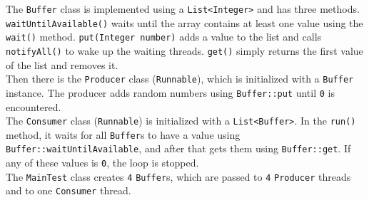 \documentclass{article}
\begin{document}
  The \texttt{Buffer} class is implemented using a \texttt{List<Integer>} and has three methods. \texttt{waitUntilAvailable()} waits until the array contains at least one value using the \texttt{wait()} method. \texttt{put(Integer number)} adds a value to the list and calls \texttt{notifyAll()} to wake up the waiting threads. \texttt{get()} simply returns the first value of the list and removes it.\\
  Then there is the \texttt{Producer} class (\texttt{Runnable}), which is initialized with a \texttt{Buffer} instance. The producer adds random numbers using \texttt{Buffer::put} until \texttt{0} is encountered.\\
  The \texttt{Consumer} class (\texttt{Runnable}) is initialized with a \texttt{List<Buffer>}. In the \texttt{run()} method, it waits for all \texttt{Buffer}s to have a value using \texttt{Buffer::waitUntilAvailable}, and after that gets them using \texttt{Buffer::get}. If any of these values is \texttt{0}, the loop is stopped.\\
  The \texttt{MainTest} class creates \texttt{4} \texttt{Buffer}s, which are passed to \texttt{4} \texttt{Producer} threads and to one \texttt{Consumer} thread.
\end{document}
